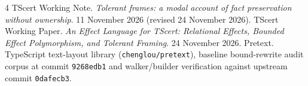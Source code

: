 \documentclass[10pt,a4paper]{article}
\newcommand{\code}[1]{\textcolor{codec}{\texttt{#1}}}
\begin{document}
\begin{thebibliography}{4}\small\setlength{\itemsep}{1pt}\setlength{\parskip}{0pt}
 TScert Working Note. \emph{Tolerant frames: a modal account of fact preservation without ownership}. 11 November 2026 (revised 24 November 2026).
 TScert Working Paper. \emph{An Effect Language for TScert: Relational Effects, Bounded Effect Polymorphism, and Tolerant Framing}. 24 November 2026.
 Pretext. TypeScript text-layout library (\texttt{chenglou/pretext}), baseline bound-rewrite audit corpus at commit \code{9268edb1} and walker/builder verification against upstream commit \code{0dafecb3}.
\end{thebibliography}
\end{document}
